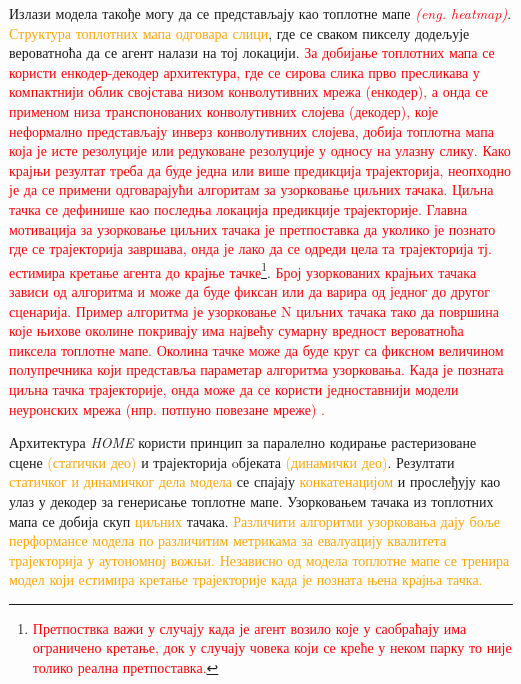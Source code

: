 \documentclass[11pt,oneside]{memoir}
\begin{document}
Излази модела такође могу да се представљају као топлотне мапе \textcolor{red}{\textit{(eng. heatmap)}}. \textcolor{orange}{Структура топлотних мапа
одговара слици}, где се сваком пикселу додељује вероватноћа
да се агент налази на тој локацији. \textcolor{red}{За добијање топлотних мапа се користи енкодер-декодер архитектура, где се сирова слика
прво пресликава у компактнији облик својстава низом конволутивних мрежа (енкодер), а онда се 
применом низа транспонованих конволутивних слојева (декодер), које неформално представљају инверз конволутивних слојева, добија
топлотна мапа која је исте резолуције или редуковане резолуције у односу на улазну слику.
Како крајњи резултат треба да буде једна или више предикција трајекторија, неопходно је да се примени одговарајући алгоритам за
узорковање циљних тачака. Циљна тачка
се дефинише као последња локација предикције трајекторије. Главна мотивација за узорковање циљних тачака је претпоставка да уколико је познато где се
трајекторија завршава, онда је лако да се одреди цела та трајекторија тј. естимира кретање агента до крајње тачке}\footnote{\textcolor{red}{Претпоствка важи 
у случају када је агент возило које у саобраћају има ограничено кретање, док у случају човека који се креће у неком парку то није толико реална
претпоставка.}}. \textcolor{red}{Број узоркованих крајњих тачака зависи од алгоритма и може да буде фиксан или да варира од једног до другог сценарија. 
Пример алгоритма је узорковање N циљних тачака тако да површина које њихове околине покривају има највећу сумарну вредност вероватноћа 
пиксела топлотне мапе. Околина
тачке може да буде круг са фиксном величином полупречника који представља параметар алгоритма узорковања. Када је позната циљна тачка трајекторије,
онда може да се користи једноставнији модели неуронских мрежа (нпр. потпуно повезане мреже) \cite{home, centernet}.}

Архитектура \textit{HOME} \cite{home} користи принцип за паралелно кодирање растеризоване сцене \textcolor{orange}{(статички део)} 
и трајекторија oбјеката \textcolor{orange}{(динамички део)}. Резултати
\textcolor{orange}{статичког и динамичког дела модела} се спајају \textcolor{orange}{конкатенацијом} и прослеђују као улаз у декодер за генерисање топлотне мапе. 
Узорковањем тачака из топлотних мапа се добија скуп \textcolor{orange}{циљних} тачака. \textcolor{orange}{Различити алгоритми узорковања дају
боље перформансе модела по различитим метрикама за евалуацију квалитета трајекторија у аутономној вожњи. Независно од модела топлотне мапе
се тренира модел који естимира кретање трајекторије када је позната њена крајња тачка.}
\end{document}
